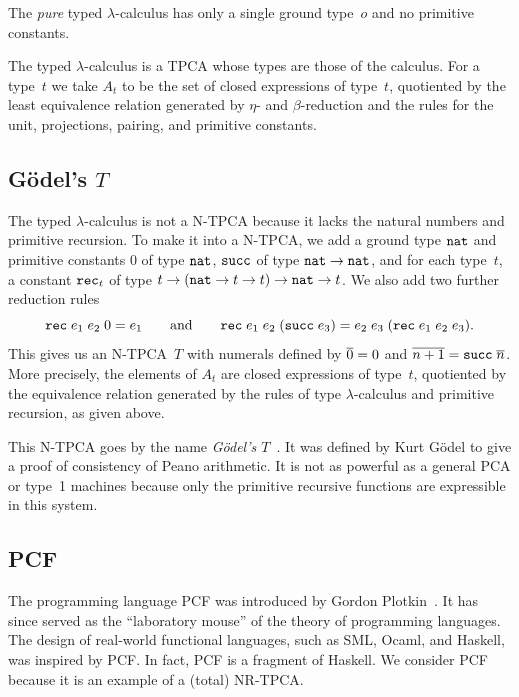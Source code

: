 The \emph{pure} typed $\lambda$-calculus has only a single ground
type~$o$ and no primitive constants.

The typed $\lambda$-calculus is a TPCA whose types are those of the
calculus. For a type~$t$ we take $A_t$ to be the set of closed
expressions of type~$t$, quotiented by the least equivalence relation
generated by $\eta$- and $\beta$-reduction and the rules for the unit,
projections, pairing, and primitive constants.


\subsection{G\"odel's $T$}

The typed $\lambda$-calculus is not a N-TPCA because it lacks the
natural numbers and primitive recursion. To make it into a N-TPCA, we
add a ground type $\mathtt{nat}$ and primitive constants $0$ of type
$\mathtt{nat}$, $\mathtt{succ}$ of type $\mathtt{nat} \to \mathtt{nat}$, and for each
type~$t$, a constant $\mathtt{rec}_t$ of type $t \to (\mathtt{nat} \to t
\to t) \to \mathtt{nat} \to t$. We also add two further reduction rules
%
\begin{equation*}
  \mathtt{rec} \; e_1 \; e_2 \; 0 = e_1
  \qquad\text{and}\qquad
  \mathtt{rec} \; e_1 \; e_2 \; (\mathtt{succ} \; e_3) =
  e_2 \; e_3 \; (\mathtt{rec} \; e_1 \; e_2 \; e_3).
\end{equation*}
%
This gives us an N-TPCA~$T$ with numerals defined by $\overline{0} = 0$
and $\overline{n+1} = \mathtt{succ} \; \overline{n}$. More precisely, the
elements of $A_t$ are closed expressions of type~$t$, quotiented by
the equivalence relation generated by the rules of type
$\lambda$-calculus and primitive recursion, as given above.

This N-TPCA goes by the name \emph{G\"odel's
  $T$}~\cite{GoedelK:ubeefs}. It was defined by Kurt G\"odel to give a
proof of consistency of Peano arithmetic. It is not as powerful as a
general PCA or type~1 machines because only the primitive recursive
functions are expressible in this system.

\subsection{PCF}
\label{sec:pcf}

The programming language PCF was introduced by Gordon
Plotkin~\cite{plotkin77:_lcf_consid_as_progr_languag}. It has since
served as the ``laboratory mouse'' of the theory of programming
languages. The design of real-world functional languages, such as SML,
Ocaml, and Haskell, was inspired by PCF. In fact, PCF is a fragment of
Haskell. We consider PCF because it is an example of a (total)
NR-TPCA.

